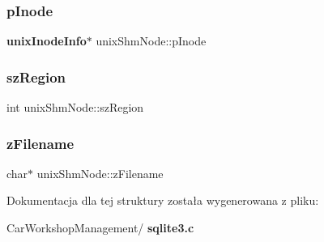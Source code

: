 \mbox{\label{structunix_shm_node_ab6bc1cf84d65887a3395da6406843817}} 
\subsubsection{pInode}
{\footnotesize\ttfamily \textbf{ unix\+Inode\+Info}$\ast$ unix\+Shm\+Node\+::p\+Inode}

\mbox{\label{structunix_shm_node_ae8126f9db70a758c2f340ec06869e02b}} 
\subsubsection{szRegion}
{\footnotesize\ttfamily int unix\+Shm\+Node\+::sz\+Region}

\mbox{\label{structunix_shm_node_a188c3bc5fcb4666ad0817ac093e7505d}} 
\subsubsection{zFilename}
{\footnotesize\ttfamily char$\ast$ unix\+Shm\+Node\+::z\+Filename}



Dokumentacja dla tej struktury została wygenerowana z pliku\+:\begin{DoxyCompactItemize}
\item 
Car\+Workshop\+Management/\textbf{ sqlite3.\+c}\end{DoxyCompactItemize}

